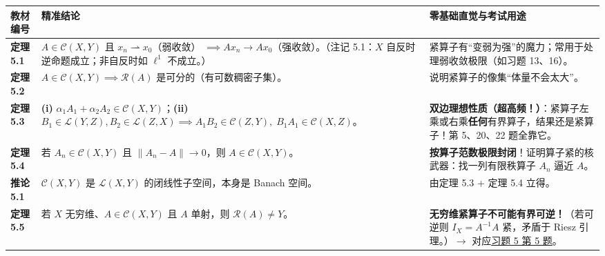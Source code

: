 \documentclass[11pt,a4paper]{article}
\newcounter{none}
\begin{document}
{\def\LTcaptype{none} %
{\small\renewcommand{\arraystretch}{1.38}\setlength{\tabcolsep}{5pt}
\begin{longtable}[]{@{}
  >{\raggedright\arraybackslash}p{}
  >{\raggedright\arraybackslash}p{}
  >{\raggedright\arraybackslash}p{}@{}}
\toprule\noalign{}
\rowcolor{AccentSoft}
\begin{minipage}[b]{\linewidth}\raggedright
教材编号
\end{minipage} & \begin{minipage}[b]{\linewidth}\raggedright
精准结论
\end{minipage} & \begin{minipage}[b]{\linewidth}\raggedright
零基础直觉与考试用途
\end{minipage} \\
\midrule\noalign{}
\endhead
\bottomrule\noalign{}
\endlastfoot
\textbf{定理 5.1} & \(A \in \mathcal{C}(X, Y)\) 且 \(x_n \rightharpoonup x_0\)（弱收敛） \(\implies Ax_n \to Ax_0\)（强收敛）。（注记 5.1：\(X\) 自反时逆命题成立；非自反时如 \(\ell^1\) 不成立。） & 紧算子有``变弱为强''的魔力；常用于处理弱收敛极限（如习题 13、16）。 \\
\textbf{定理 5.2} & \(A \in \mathcal{C}(X, Y) \implies \mathcal{R}(A)\) 是可分的（有可数稠密子集）。 & 说明紧算子的像集``体量不会太大''。 \\
\textbf{定理 5.3} & \textbf{(i)} \(\alpha_1 A_1 + \alpha_2 A_2 \in \mathcal{C}(X, Y)\)；\textbf{(ii)} \(B_1 \in \mathcal{L}(Y, Z), B_2 \in \mathcal{L}(Z, X) \implies A_1 B_2 \in \mathcal{C}(Z, Y), \; B_1 A_1 \in \mathcal{C}(X, Z)\)。 & \textbf{双边理想性质（超高频！）}：紧算子左乘或右乘\textbf{任何}有界算子，结果还是紧算子！第 5、20、22 题全靠它。 \\
\textbf{定理 5.4} & 若 \(A_n \in \mathcal{C}(X, Y)\) 且 \(\lVert A_n - A\rVert \to 0\)，则 \(A \in \mathcal{C}(X, Y)\)。 & \textbf{按算子范数极限封闭}！证明算子紧的核武器：找一列有限秩算子 \(A_n\) 逼近 \(A\)。 \\
\textbf{推论 5.1} & \(\mathcal{C}(X, Y)\) 是 \(\mathcal{L}(X, Y)\) 的闭线性子空间，本身是 Banach 空间。 & 由定理 5.3 + 定理 5.4 立得。 \\
\textbf{定理 5.5} & 若 \(X\) 无穷维、\(A \in \mathcal{C}(X, Y)\) 且 \(A\) 单射，则 \(\mathcal{R}(A) \neq Y\)。 & \textbf{无穷维紧算子不可能有界可逆！}（若可逆则 \(I_X = A^{-1}A\) 紧，矛盾于 Riesz 引理。）\(\to\) 对应\hyperlink{card:5-5}{\textcolor{LinkColor}{习题 5 第 5 题}}。 \\

\end{longtable}}}
\end{document}
